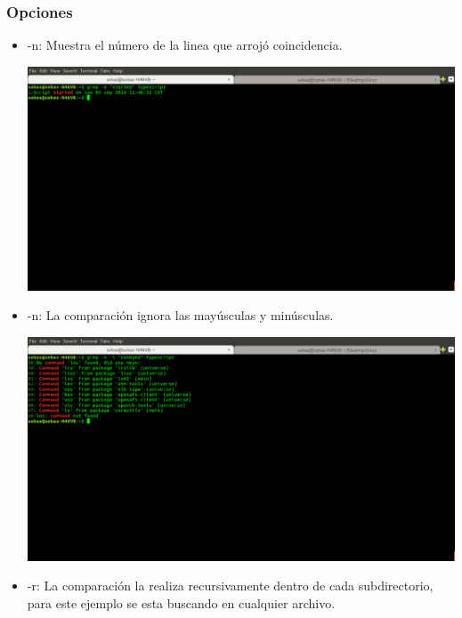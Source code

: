 \documentclass{article}
\begin{document}
\subsubsection{Opciones}
\begin{itemize}
	\item -n: Muestra el número de la linea que arrojó coincidencia.\par
    	\begin{minipage}{\linewidth}
            \centering
            \includegraphics[width=\textwidth]{grep-n.png}
        \end{minipage}
    \item -n: La comparación ignora las mayúsculas y minúsculas.\par
    	\begin{minipage}{\linewidth}
            \centering
            \includegraphics[width=\textwidth]{grep-i.png}
        \end{minipage}  
    \item -r: La comparación la realiza recursivamente dentro de cada subdirectorio, para este ejemplo se esta buscando en cualquier archivo.\par

\end{itemize}
\end{document}
